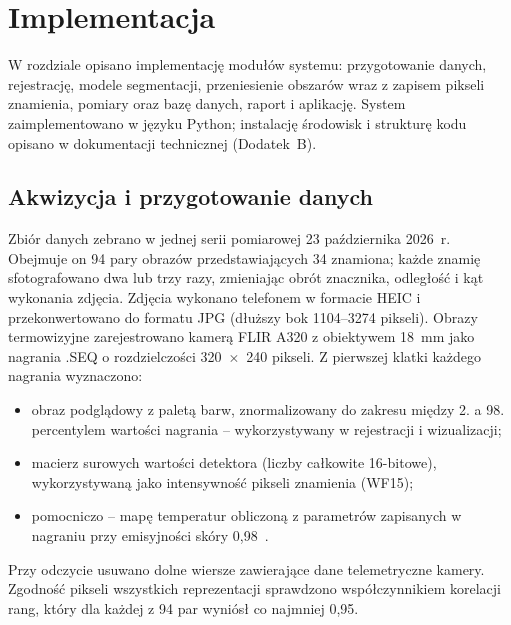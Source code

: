
\chapter{Implementacja}
\label{chap:implementacja}

W rozdziale opisano implementację modułów systemu: przygotowanie danych, rejestrację, modele segmentacji, przeniesienie obszarów wraz z zapisem pikseli znamienia, pomiary oraz bazę danych, raport i aplikację. System zaimplementowano w języku Python; instalację środowisk i strukturę kodu opisano w dokumentacji technicznej (Dodatek~B).

\section{Akwizycja i przygotowanie danych}
\label{sec:dane}

Zbiór danych zebrano w jednej serii pomiarowej 23 października 2026~r. Obejmuje on 94 pary obrazów przedstawiających 34 znamiona; każde znamię sfotografowano dwa lub trzy razy, zmieniając obrót znacznika, odległość i kąt wykonania zdjęcia. Zdjęcia wykonano telefonem w formacie HEIC i przekonwertowano do formatu JPG (dłuższy bok 1104--3274 pikseli). Obrazy termowizyjne zarejestrowano kamerą FLIR A320 z obiektywem 18~mm jako nagrania .SEQ o rozdzielczości 320~$\times$~240 pikseli. Z pierwszej klatki każdego nagrania wyznaczono:
\begin{itemize}
  \item obraz podglądowy z paletą barw, znormalizowany do zakresu między 2. a 98. percentylem wartości nagrania -- wykorzystywany w rejestracji i wizualizacji;
  \item macierz surowych wartości detektora (liczby całkowite 16-bitowe), wykorzystywaną jako intensywność pikseli znamienia (WF15);
  \item pomocniczo -- mapę temperatur obliczoną z parametrów zapisanych w nagraniu przy emisyjności skóry 0,98~\cite{infared-thermal-imaging}.
\end{itemize}
Przy odczycie usuwano dolne wiersze zawierające dane telemetryczne kamery. Zgodność pikseli wszystkich reprezentacji sprawdzono współczynnikiem korelacji rang, który dla każdej z 94 par wyniósł co najmniej 0,95.

